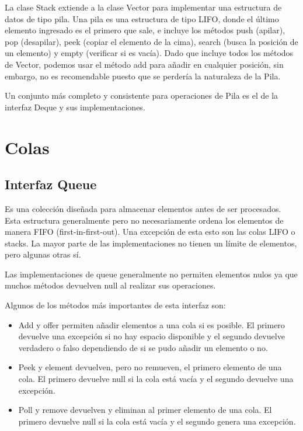 \documentclass[11pt]{article}
\begin{document}
La clase Stack extiende a la clase Vector para implementar una 
estructura de datos de tipo pila. Una pila es una estructura de tipo 
LIFO, donde el último elemento ingresado es el primero que sale, e 
incluye los métodos push (apilar), pop (desapilar), peek (copiar el 
elemento de la cima), search (busca la posición de un elemento) y 
empty (verificar si es vacía). Dado que incluye todos los métodos de 
Vector, podemos usar el método add para añadir en cualquier posición, 
sin embargo, no es recomendable puesto que se perdería la naturaleza 
de la Pila.

\par

Un conjunto más completo y consistente para operaciones de Pila es el 
de la interfaz Deque y sus implementaciones. 

\section{Colas}

\subsection{Interfaz Queue}

\par

Es una colección diseñada para almacenar elementos antes de ser 
procesados. Esta estructura generalmente pero no necesariamente 
ordena los elementos de manera FIFO (first-in-first-out). Una 
excepción de esta esto son las colas LIFO o stacks. La mayor parte de 
las implementaciones no tienen un límite de elementos, pero algunas 
otras sí.

\par

Las implementaciones de queue generalmente no permiten elementos 
nulos ya que muchos métodos devuelven null al realizar sus 
operaciones.

\par

Algunos de los métodos más importantes de esta interfaz son:

\begin{itemize}

\item Add y offer permiten añadir elementos a una cola si es posible. 
El primero devuelve una excepción si no hay espacio disponible y el 
segundo devuelve verdadero o falso dependiendo de si se pudo añadir 
un elemento o no.

\item Peek y element devuelven, pero no remueven, el primero elemento 
de una cola. El primero devuelve null si la cola está vacía y el 
segundo devuelve una excepción.

\item Poll y remove devuelven y eliminan al primer elemento de una 
cola. El primero devuelve null si la cola está vacía y el segundo 
genera una excepción.  

\end{itemize}
\end{document}
